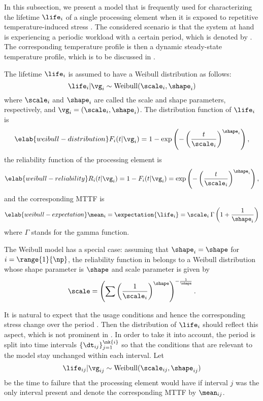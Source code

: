 In this subsection, we present a model that is frequently used for
characterizing the lifetime $\life_i$ of a single processing element when it is
exposed to repetitive temperature-induced stress \cite{huang2009b, xiang2010}.
The considered scenario is that the system at hand is experiencing a periodic
workload with a certain period, which is denoted by \period. The corresponding
temperature profile is then a dynamic steady-state temperature profile, which is
to be discussed in .

The lifetime $\life_i$ is assumed to have a Weibull distribution as follows:
\[
  \life_i | \vg_i \sim \mathrm{Weibull}(\scale_i, \shape_i)
\]
where $\scale_i$ and $\shape_i$ are called the scale and shape parameters,
respectively, and $\vg_i = (\scale_i, \shape_i)$. The distribution function of
$\life_i$ is
\begin{equation} \elab{weibull-distribution}
  F_i(t | \vg_i) = 1 - \exp\left(-\left(\frac{t}{\scale_i}\right)^{\shape_i}\right),
\end{equation}
the reliability function of the processing element is
\begin{equation} \elab{weibull-reliability}
  R_i(t | \vg_i) = 1 - F_i(t | \vg_i) = \exp\left(-\left(\frac{t}{\scale_i}\right)^{\shape_i}\right),
\end{equation}
and the corresponding \ac{MTTF} is
\begin{equation} \elab{weibull-expectation}
  \mean_i = \expectation{\life_i} = \scale_i \: \Gamma\left(1 + \frac{1}{\shape_i}\right)
\end{equation}
where $\Gamma$ stands for the gamma function.

\begin{remark} 
The Weibull model has a special case: assuming that $\shape_i = \shape$ for $i =
\range{1}{\np}$, the reliability function in  belongs to
a Weibull distribution whose shape parameter is $\shape$ and scale parameter is
given by
\[
  \scale = \left(\sum\left(\frac{1}{\scale_i}\right)^\shape\right)^{-\frac{1}{\shape}}.
\]
\end{remark}

It is natural to expect that the usage conditions and hence the corresponding
stress change over the period \period. Then the distribution of $\life_i$ should
reflect this aspect, which is not prominent in . In
order to take it into account, the period is split into  time intervals
$\{ \dt_{ij} \}_{j = 1}^{\nk{i}}$ so that the conditions that are relevant to
the model stay unchanged within each interval. Let
\[
  \life_{ij} | \vg_{ij} \sim \mathrm{Weibull}(\scale_{ij}, \shape_{ij})
\]
be the time to failure that the processing element would have if interval $j$
was the only interval present and denote the corresponding \ac{MTTF} by
$\mean_{ij}$.

